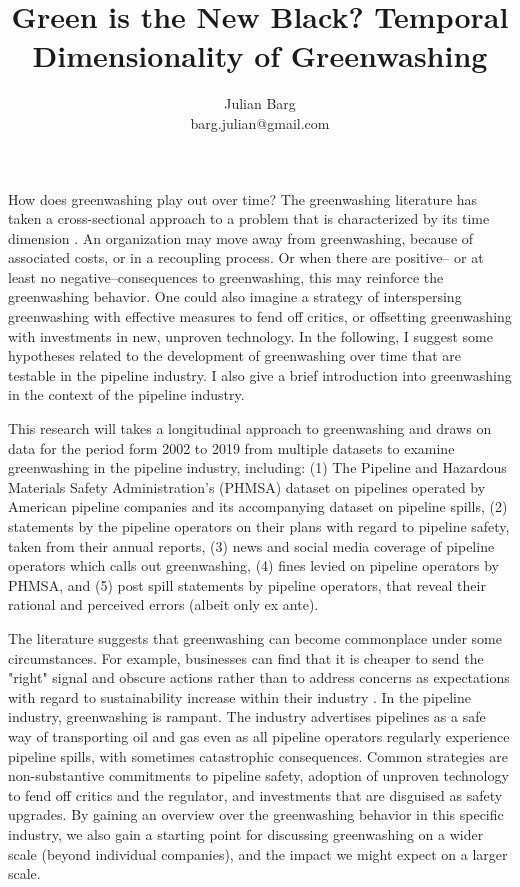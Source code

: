 \documentclass[12pt, man, natbib]{apa6}
\title{Green is the New Black? Temporal Dimensionality of Greenwashing}
\author{Julian Barg\\barg.julian@gmail.com}
\affiliation{Ivey Business School}
\begin{document}
	
	\maketitle
	
	
	\section{}
	
	How does greenwashing play out over time? The greenwashing literature has taken a cross-sectional approach to a problem that is characterized by its time dimension \citep{Lyon2015}. An organization may move away from greenwashing, because of associated costs, or in a recoupling process. Or when there are positive-- or at least no negative--consequences to greenwashing, this may reinforce the greenwashing behavior. One could also imagine a strategy of interspersing greenwashing with effective measures to fend off critics, or offsetting greenwashing with investments in new, unproven technology. In the following, I suggest some hypotheses related to the development of greenwashing over time that are testable in the pipeline industry. I also give a brief introduction into greenwashing in the context of the pipeline industry.
	
	This research will takes a longitudinal approach to greenwashing and draws on data for the period form 2002 to 2019 from multiple datasets to examine greenwashing in the pipeline industry, including: (1) The Pipeline and Hazardous Materials Safety Administration's (PHMSA) dataset on pipelines operated by American pipeline companies and its accompanying dataset on pipeline spills, (2) statements by the pipeline operators on their plans with regard to pipeline safety, taken from their annual reports, (3) news and social media coverage of pipeline operators which calls out greenwashing, (4) fines levied on pipeline operators by PHMSA, and (5) post spill statements by pipeline operators, that reveal their rational and perceived errors (albeit only ex ante).
	
	The literature suggests that greenwashing can become commonplace under some circumstances. For example, businesses can find that it is cheaper to send the "right" signal and obscure actions rather than to address concerns as expectations with regard to sustainability increase within their industry \citep{Delmas2011}. In the pipeline industry, greenwashing is rampant. The industry advertises pipelines as a safe way of transporting oil and gas even as all pipeline operators regularly experience pipeline spills, with sometimes catastrophic consequences. %
	Common strategies are non-substantive commitments to pipeline safety, adoption of unproven technology to fend off critics and the regulator, and investments that are disguised as safety upgrades. By gaining an overview over the greenwashing behavior in this specific industry, we also gain a starting point for discussing greenwashing on a wider scale (beyond individual companies), and the impact we might expect on a larger scale.
	
\end{document}
